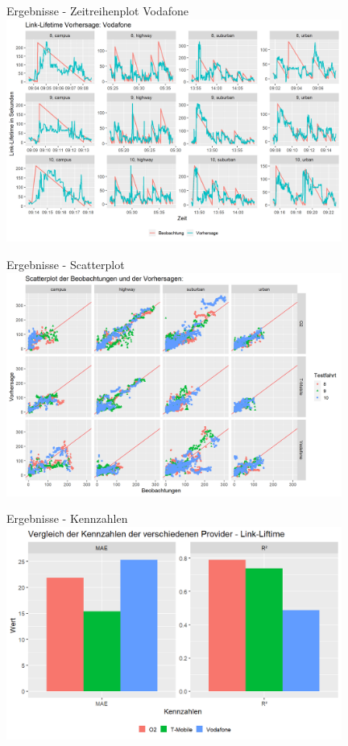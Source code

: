 \begin{frame}{Ergebnisse - Zeitreihenplot Vodafone}
\includegraphics[width = 11cm]{plots/link_lifetime/vodafone_predictions}
\end{frame}


\begin{frame}{Ergebnisse - Scatterplot}
\includegraphics[width = 11cm]{plots/link_lifetime/scatter_colored_axes_fixed}
\end{frame}


\begin{frame}{Ergebnisse - Kennzahlen}
\includegraphics[width = 11cm]{plots/link_lifetime/kennzahlen_linklifetime}
\end{frame}

